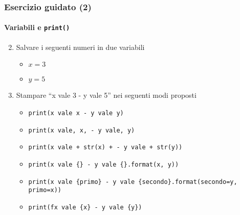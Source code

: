\begin{exerciseframe}
    \frametitle{Esercizio guidato (2)}
    \framesubtitle{Variabili e \texttt{print()}}

    \begin{enumerate}
        \setcounter{enumi}{1}
        \item Salvare i seguenti numeri in due variabili
        \begin{itemize}
            \item $x = 3$
            \item $y = 5$
        \end{itemize}

        \bigskip
        \item Stampare ``x vale 3 - y vale 5'' nei seguenti modi proposti
        \begin{itemize}
            \item \texttt{print(\textquotesingle{}x vale x - y vale y\textquotesingle{})}
            \pause
            \item \texttt{print(\textquotesingle{}x vale\textquotesingle{}, x, \textquotesingle{}- y vale\textquotesingle{}, y)}
            \pause
            \item \texttt{print(\textquotesingle{}x vale \textquotesingle{} + str(x) + \textquotesingle{} - y vale \textquotesingle{} + str(y))}
            \pause
            \item \texttt{print(\textquotesingle{}x vale \{\} - y vale \{\}\textquotesingle{}.format(x, y))}
            \pause
            \item \texttt{print(\textquotesingle{}x vale \{primo\} - y vale \{secondo\}\textquotesingle{}.format(secondo=y, primo=x))}
            \pause
            \item \texttt{print(f\textquotesingle{}x vale \{x\} - y vale \{y\}\textquotesingle{})}
        \end{itemize}
    \end{enumerate}
\end{exerciseframe}

